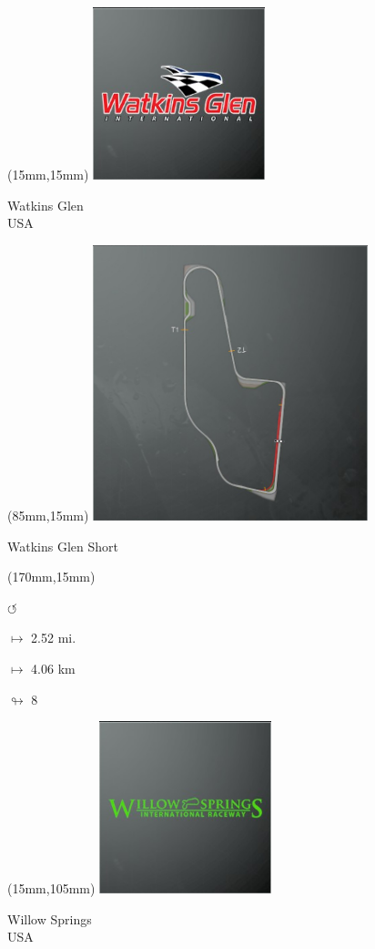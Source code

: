 \begin{textblock*}{60mm}(15mm,15mm)%
\includegraphics[width=50mm]{LG/2015-05-20_00097.png}
\par Watkins Glen\\ USA
\end{textblock*}
\begin{textblock*}{80mm}(85mm,15mm)%
\includegraphics[width=80mm]{TR/2015-05-20_00067.png}
\centerline{Watkins Glen Short}
\end{textblock*}
\begin{textblock*}{30mm}(170mm,15mm)%
\par \Huge$\circlearrowleft$
\Large
\par$\mapsto$ 2.52 mi.
\par$\mapsto$ 4.06 km
\par$\looparrowright$ 8
\end{textblock*}
\begin{textblock*}{60mm}(15mm,105mm)%
\includegraphics[width=50mm]{LG/2015-05-20_00098.png}
\par Willow Springs\\ USA
\end{textblock*}
